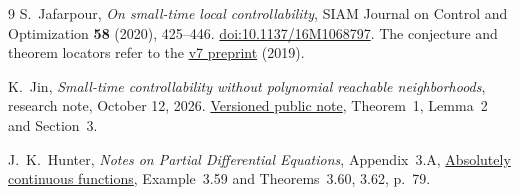 \documentclass[11pt,a4paper]{article}
\begin{document}
\begin{thebibliography}{9}
S.~Jafarpour,
\emph{On small-time local controllability},
SIAM Journal on Control and Optimization \textbf{58} (2020), 425--446.
\href{https://doi.org/10.1137/16M1068797}{doi:10.1137/16M1068797}.
The conjecture and theorem locators refer to the
\href{https://arxiv.org/abs/1604.02432v7}{v7 preprint} (2019).

K.~Jin,
\emph{Small-time controllability without polynomial reachable neighborhoods},
research note, October 12, 2026.
\href{https://github.com/yuiyuiui/AIM/blob/fff30eeb072395341d9944e4c75d5267b770f3b8/research/solutions/417-polynomial-reachable-growth-counterexample/paper/main.pdf}{Versioned public note},
Theorem~1, Lemma~2 and Section~3.

J.~K.~Hunter,
\emph{Notes on Partial Differential Equations}, Appendix~3.A,
\href{https://www.math.ucdavis.edu/~hunter/pdes/ch3A.pdf}{Absolutely continuous functions},
Example~3.59 and Theorems~3.60, 3.62, p.~79.
\end{thebibliography}
\end{document}
